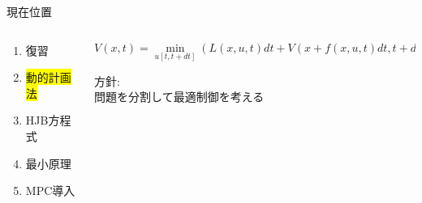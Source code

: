 \documentclass[twocolumn, dvipdfmx,12pt]{beamer}
\begin{document}
    \begin{frame}{現在位置}
        \footnotesize
        \begin{columns}
            \begin{column}{.35\textwidth}
                \begin{enumerate}
                    \item 復習
                    \item \colorbox{yellow}{動的計画法}
                    \item HJB方程式
                    \item 最小原理
                    \item MPC導入
                \end{enumerate}
            \end{column}
    
            \begin{column}{.7\textwidth}
                \fontsize{7.5pt}{3.5pt}\selectfont
                \begin{screen}
                    \begin{equation*}
                        V(x, t) = \min_{u[t, t+dt]} \left( L(x, u, t) dt + V \left( x + f(x, u, t) dt, t + dt \right) \right)
                    \end{equation*}
                \end{screen}
                \footnotesize
                方針:\\
                \qquad 問題を分割して最適制御を考える \\

            \end{column}
        \end{columns}
    \end{frame}
\end{document}

